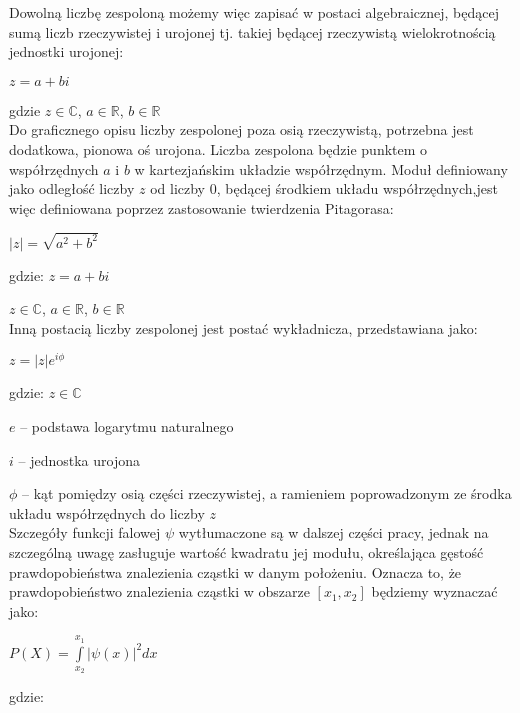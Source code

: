 \documentclass{SGGW-thesis}
\begin{document}
	Dowolną liczbę zespoloną możemy więc zapisać w postaci algebraicznej, będącej sumą liczb rzeczywistej i urojonej tj. takiej będącej rzeczywistą wielokrotnością jednostki urojonej:
	
	\begin{center}
	$z = a+bi$
	\end{center}
	
	gdzie
	$z \in \mathbb{C}$,
	$a \in \mathbb{R}$,
	$b \in \mathbb{R}$\\
	
	Do graficznego opisu liczby zespolonej poza osią rzeczywistą, potrzebna jest dodatkowa, pionowa oś urojona. Liczba zespolona będzie punktem o współrzędnych $a$ i $b$ w kartezjańskim układzie współrzędnym. Moduł definiowany jako odległość liczby $z$ od liczby $0$, będącej środkiem układu współrzędnych,jest więc definiowana poprzez zastosowanie twierdzenia Pitagorasa:
	
	\begin{center}
	$|z| = \sqrt{a^2+b^2}$
	\end{center}
	
	gdzie:
	$ z = a + bi$
	
	$z \in \mathbb{C}$,
	$a \in \mathbb{R}$,
	$b \in \mathbb{R}$\\
	
	Inną postacią liczby zespolonej jest postać wykładnicza, przedstawiana jako:
	
	\begin{center}
	$z = |z|e^{i\phi}$
	\end{center}
	
	gdzie:
	$z \in \mathbb{C}$
	
	$e$ -- podstawa logarytmu naturalnego
	
	$i$ -- jednostka urojona
	
	$\phi$ -- kąt pomiędzy osią części rzeczywistej, a ramieniem poprowadzonym ze środka układu współrzędnych do liczby $z$\\
	
	Szczegóły funkcji falowej $\psi$ wytłumaczone są w dalszej części pracy, jednak na szczególną uwagę zasługuje wartość kwadratu jej modułu, określająca gęstość prawdopobieństwa znalezienia cząstki w danym położeniu. Oznacza to, że prawdopobieństwo znalezienia cząstki w obszarze $[x_1, x_2]$ będziemy wyznaczać jako:
	\begin{center}
	 	$P(X) = \int\limits_{x_2}^{x_1} |\psi(x)|^2dx$
	\end{center}
	
	gdzie:
	
\end{document}
